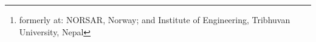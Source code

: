 \author{
Hom Nath Gharti\footnote{formerly at: NORSAR, Norway; and Institute of Engineering, Tribhuvan University, Nepal}, Princeton University, USA \\
Leah Langer, Princeton University, USA \\
Michael Roth, NORSAR, Norway \\
Jeroen Tromp, Princeton University, USA \\
Uno Vaaland, Princeton University, USA \\
Zhenzhen Yan, Institute of Remote Sensing and Digital Earth, CAS, China
}

